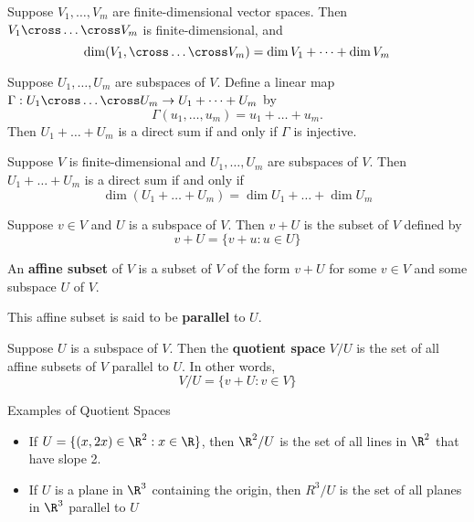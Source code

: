 \begin{theorem} 
   Suppose $V_1, \dots, V_m$ are finite-dimensional vector spaces.
   Then $V_1 \cross \dots \cross V_m$ is finite-dimensional, and
   \[ \dim(V_1, \cross \dots \cross V_m) = \dim V_1 + \dots + \dim V_m \]
\end{theorem}

\begin{theorem}
   Suppose $U_1, \dots, U_m$ are subspaces of $V$.
   Define a linear map $\Gamma: U_1 \cross \dots \cross U_m \to U_1 + \dots + U_m$ by
   \[ \Gamma(u_1, \dots, u_m) = u_1 + \dots + u_m. \]
   Then $U_1 + \dots + U_m$ is a direct sum if and only if $\Gamma$ is injective.
\end{theorem}

\begin{theorem}
   Suppose $V$ is finite-dimensional and $U_1, \dots, U_m$ are subspaces of $V$.
   Then $U_1 + \dots + U_m$ is a direct sum if and only if
   \[ \dim(U_1 + \dots + U_m) = \dim U_1 + \dots + \dim U_m \]
\end{theorem}

\begin{definition}
   Suppose $v \in V$ and $U$ is a subspace of $V$. Then $v + U$ is
   the subset of $V$ defined by
   \[ v+U = \{v+u : u \in U \} \]
\end{definition}

\begin{definition} 
   An \textbf{affine subset} of $V$ is a subset of $V$ of the form
   $v + U$ for some $v \in V$ and some subspace $U$ of $V$.

   This affine subset is said to be \textbf{parallel} to $U$.
\end{definition}

\begin{definition}
   Suppose $U$ is a subspace of $V$. Then the \textbf{quotient space}
   $V / U$ is the set of all affine subsets of $V$ parallel to $U$. In other words,
   \[ V/U = \{ v+U : v \in V \} \]
\end{definition}

\begin{example} Examples of Quotient Spaces
   \begin{itemize}
      \item If $U = \{(x, 2x) \in \R^2 : x \in \R \}$, then $\R^2 / U$ is the set of all lines
      in $\R^2$ that have slope 2.
      \item If $U$ is a plane in $\R^3$ containing the origin, then $R^3/U$ is the set of all planes
      in $\R^3$ parallel to $U$
   \end{itemize}
\end{example}


